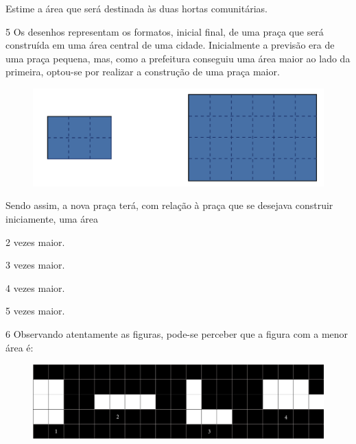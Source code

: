 Estime a área que será destinada às duas hortas comunitárias.

\begin{emptybox}
\end{emptybox}


\num{5} Os desenhos representam os formatos, inicial  final, de uma praça que será construída em uma
área central de uma cidade. Inicialmente a previsão era de uma praça
pequena, mas, como a prefeitura conseguiu uma área maior ao lado da
primeira, optou-se por realizar a construção de uma praça maior.

\begin{figure}[htpb!]
\centering
\includegraphics[width=.5\textwidth]{../ilustracoes/MAT5/SAEB_5ANO_MAT_figura39.png}
\end{figure}

Sendo assim, a nova praça terá, com relação à praça que se
desejava construir iniciamente, uma área

\begin{escolha}
\item
  2 vezes maior.
\item
  3 vezes maior.
\item
  4 vezes maior. 
\item
  5 vezes maior.
\end{escolha}

\pagebreak
\num{6} Observando atentamente as figuras, pode-se perceber que a figura com a menor área é:

\begin{figure}[htpb!]
\includegraphics[width=\textwidth]{../ilustracoes/MAT5/SAEB_5ANO_MAT_figura40.png}
\end{figure}

